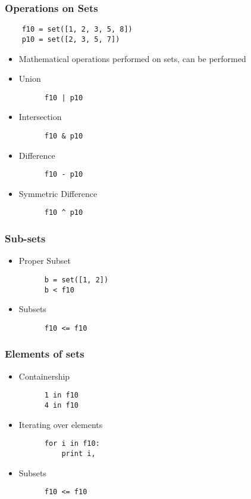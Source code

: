 \begin{frame}[fragile]
  \frametitle{Operations on Sets}
  \begin{lstlisting}
    f10 = set([1, 2, 3, 5, 8])
    p10 = set([2, 3, 5, 7])
  \end{lstlisting}
  \begin{itemize}
  \item Mathematical operations performed on sets, can be performed
  \end{itemize}
  \begin{itemize}
  \item Union
    \begin{lstlisting}
      f10 | p10
    \end{lstlisting}
  \item Intersection
    \begin{lstlisting}
      f10 & p10
    \end{lstlisting}
  \item Difference
    \begin{lstlisting}
      f10 - p10
    \end{lstlisting}
  \item Symmetric Difference
    \begin{lstlisting}
      f10 ^ p10
    \end{lstlisting}
  \end{itemize}
\end{frame}

\begin{frame}[fragile]
  \frametitle{Sub-sets}
  \begin{itemize}
  \item Proper Subset
    \begin{lstlisting}
      b = set([1, 2])
      b < f10
    \end{lstlisting}
  \item Subsets
    \begin{lstlisting}
      f10 <= f10
    \end{lstlisting}
  \end{itemize}
\end{frame}

\begin{frame}[fragile]
  \frametitle{Elements of sets}
  \begin{itemize}
  \item Containership
    \begin{lstlisting}
      1 in f10
      4 in f10
    \end{lstlisting}
  \item Iterating over elements
    \begin{lstlisting}
      for i in f10:
          print i,
    \end{lstlisting}
  \item Subsets
    \begin{lstlisting}
      f10 <= f10
    \end{lstlisting}
  \end{itemize}
\end{frame}


